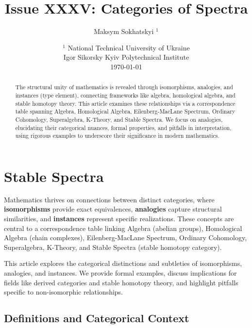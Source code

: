 \documentclass{article}
\theoremstyle{plain}
\theoremstyle{definition}
\begin{document}
\title{Issue XXXV: Categories of Spectra}
\author{Maksym Sokhatskyi $^1$}
\date{ $^1$ National Technical University of Ukraine \\
       \small Igor Sikorsky Kyiv Polytechnical Institute \\
       \today }

\maketitle

\begin{abstract}
The structural unity of mathematics is revealed through isomorphisms, analogies, and instances (type element),
connecting frameworks like algebra, homological algebra, and stable homotopy theory.
This article examines these relationships via a correspondence table spanning Algebra,
Homological Algebra, Eilenberg-MacLane Spectrum, Ordinary Cohomology, Superalgebra, K-Theory, and Stable Spectra.
We focus on analogies, elucidating their categorical nuances, formal properties,
and pitfalls in interpretation, using rigorous examples to underscore their significance in modern mathematics.
\end{abstract}

\ifincludeTOC
\tableofcontents
\fi

\section{Stable Spectra}

Mathematics thrives on connections between distinct categories,
where \textbf{isomorphisms} provide exact equivalences, \textbf{analogies}
capture structural similarities, and \textbf{instances} represent
specific realizations. These concepts are central to a correspondence
table linking Algebra (abelian groups), Homological Algebra (chain complexes),
Eilenberg-MacLane Spectrum, Ordinary Cohomology, Superalgebra, K-Theory, and
Stable Spectra (stable homotopy category).

This article explores the categorical distinctions and subtleties
of isomorphisms, analogies, and instances. We provide formal
examples, discuss implications for fields like derived categories and
stable homotopy theory, and highlight pitfalls specific to non-isomorphic
relationships.

\subsection{Definitions and Categorical Context}
\end{document}
